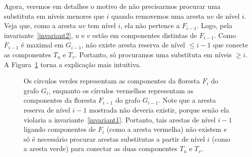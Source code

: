Agora, veremos em detalhes o motivo de não precisarmos procurar uma substituta em níveis menores que $i$ quando removemos uma aresta $uv$ de nível $i$. Veja que, como a aresta $uv$ tem nível $i$, ela não pertence a $F_{i-1}$. Logo, pela invariante~\ref{invariant2}, $u$ e $v$ estão em componentes distintas de $F_{i-1}$. Como $F_{i-1}$ é maximal em $G_{i-1}$, não existe aresta reserva de nível $\leq i - 1$ que conecte as componentes $T_u$ e $T_v$. Portanto, só procuramos uma substituta em níveis $\geq i$. A Figura~\ref{fig:why-not-search-in-less-or-equal-than-i} torna a explicação mais intuitiva.

\begin{figure}[H]
    \centering
    \caption{Os círculos verdes representam as componentes da floresta $F_i$ do grafo $G_i$, enquanto os círculos vermelhos representam as componentes da floresta $F_{i-1}$ do grafo $G_{i-1}$. Note que a aresta reserva de nível $i-1$ mostrada não deveria existir, porque senão ela violaria a invariante~\ref{invariant1}. Portanto, tais arestas de nível $i-1$ ligando componentes de $F_i$ (como a aresta vermelha) não existem e só é necessário procurar arestas substitutas a partir de nível $i$ (como a aresta verde) para conectar as duas componentes $T_u$ e $T_v$.}
    \label{fig:why-not-search-in-less-or-equal-than-i}
\end{figure}

